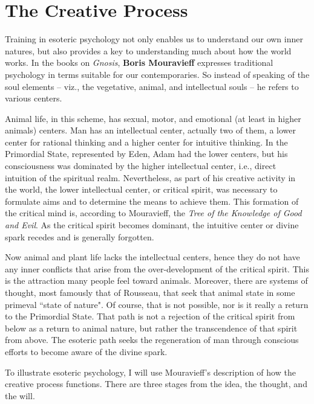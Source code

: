 \section{The Creative Process}

Training in esoteric psychology not only enables us to understand our own inner natures, but also provides a key to understanding much about how the world works. In the books on \emph{Gnosis}, \textbf{Boris Mouravieff} expresses traditional psychology in terms suitable for our contemporaries. So instead of speaking of the soul elements – viz., the vegetative, animal, and intellectual souls – he refers to various centers.

Animal life, in this scheme, has sexual, motor, and emotional (at least in higher animals) centers. Man has an intellectual center, actually two of them, a lower center for rational thinking and a higher center for intuitive thinking. In the Primordial State, represented by Eden, Adam had the lower centers, but his consciousness was dominated by the higher intellectual center, i.e., direct intuition of the spiritual realm. Nevertheless, as part of his creative activity in the world, the lower intellectual center, or critical spirit, was necessary to formulate aims and to determine the means to achieve them. This formation of the critical mind is, according to Mouravieff, the \emph{Tree of the Knowledge of Good and Evil}. As the critical spirit becomes dominant, the intuitive center or divine spark recedes and is generally forgotten.

Now animal and plant life lacks the intellectual centers, hence they do not have any inner conflicts that arise from the over-development of the critical spirit. This is the attraction many people feel toward animals. Moreover, there are systems of thought, most famously that of Rousseau, that seek that animal state in some primeval ``state of nature". Of course, that is not possible, nor is it really a return to the Primordial State. That path is not a rejection of the critical spirit from below as a return to animal nature, but rather the transcendence of that spirit from above. The esoteric path seeks the regeneration of man through conscious efforts to become aware of the divine spark.

To illustrate esoteric psychology, I will use Mouravieff's description of how the creative process functions. There are three stages from the idea, the thought, and the will.

